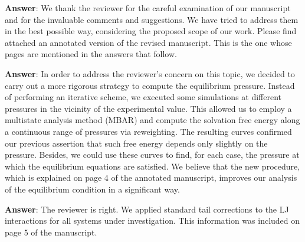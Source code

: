 \documentclass[]{article}
\begin{document}
\textbf{Answer}: We thank the reviewer for the careful examination of our manuscript and for the invaluable comments and suggestions.
We have tried to address them in the best possible way, considering the proposed scope of our work.
Please find attached an annotated version of the revised manuscript.
This is the one whose pages are mentioned in the answers that follow.

{\color{blue}{1) The authors chose not to use an iterative scheme to correct the pressure of their simulations. They should justify their choice by including quantitative information from their simulations on how this correction would affect both the differences in the free energy but also the system's density at high concentrations.}}

\textbf{Answer}:
In order to address the reviewer's concern on this topic, we decided to carry out a more rigorous strategy to compute the equilibrium pressure.
Instead of performing an iterative scheme, we executed some simulations at different pressures in the vicinity of the experimental value.
This allowed us to employ a multistate analysis method (MBAR) and compute the solvation free energy along a continuous range of pressures via reweighting.
The resulting curves confirmed our previous assertion that such free energy depends only slightly on the pressure.
Besides, we could use these curves to find, for each case, the pressure at which the equilibrium equations are satisfied.
We believe that the new procedure, which is explained on page 4 of the annotated manuscript, improves our analysis of the equilibrium condition in a significant way.

{\color{blue}{2) Among the various existing models used in this work, some explicitly report the use of LJ long range corrections in the energy and pressure. The authors should clearly state if they have taken that into account in their simulations.}}

\textbf{Answer}: The reviewer is right. We applied standard tail corrections to the LJ interactions for all systems under investigation. This information was included on page 5 of the manuscript.

{}
\end{document}

